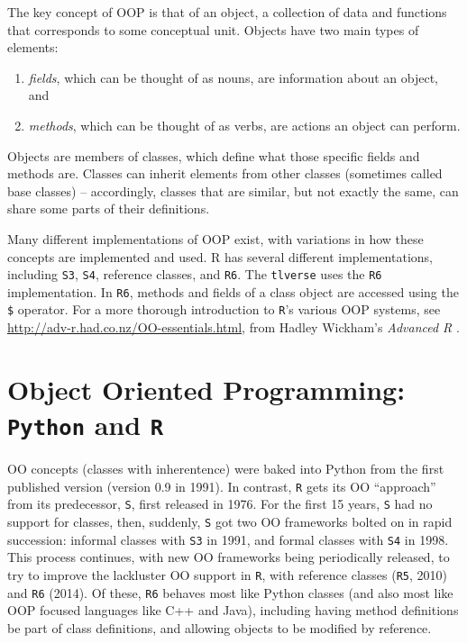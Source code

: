 \documentclass[
  12pt, krantz2,
]{krantz}
\newcommand{\passthrough}[1]{#1}
\providecommand{\tightlist}{%
  \setlength{\itemsep}{0pt}\setlength{\parskip}{0pt}}
\theoremstyle{definition}
\theoremstyle{definition}
\theoremstyle{definition}
\newcommand{\1}{\mathbbm{1}}
\begin{document}
The key concept of OOP is that of an object, a collection of data and functions
that corresponds to some conceptual unit. Objects have two main types of
elements:

\begin{enumerate}
\def\labelenumi{\arabic{enumi}.}
\tightlist
\item
  \emph{fields}, which can be thought of as nouns, are information about an object,
  and
\item
  \emph{methods}, which can be thought of as verbs, are actions an object can
  perform.
\end{enumerate}

Objects are members of classes, which define what those specific fields and
methods are. Classes can inherit elements from other classes (sometimes called
base classes) -- accordingly, classes that are similar, but not exactly the
same, can share some parts of their definitions.

Many different implementations of OOP exist, with variations in how these
concepts are implemented and used. R has several different implementations,
including \passthrough{\lstinline!S3!}, \passthrough{\lstinline!S4!}, reference classes, and \passthrough{\lstinline!R6!}. The \passthrough{\lstinline!tlverse!} uses the \passthrough{\lstinline!R6!}
implementation. In \passthrough{\lstinline!R6!}, methods and fields of a class object are accessed using
the \passthrough{\lstinline!$!} operator. For a more thorough introduction to \passthrough{\lstinline!R!}'s various OOP systems,
see \url{http://adv-r.had.co.nz/OO-essentials.html}, from Hadley Wickham's \emph{Advanced
R} \citep{wickham2014advanced}.

\hypertarget{object-oriented-programming-python-and-r}{%
\section{\texorpdfstring{Object Oriented Programming: \texttt{Python} and \texttt{R}}{Object Oriented Programming: Python and R}}\label{object-oriented-programming-python-and-r}}

OO concepts (classes with inherentence) were baked into Python from the first
published version (version 0.9 in 1991). In contrast, \passthrough{\lstinline!R!} gets its OO ``approach''
from its predecessor, \passthrough{\lstinline!S!}, first released in 1976. For the first 15 years, \passthrough{\lstinline!S!}
had no support for classes, then, suddenly, \passthrough{\lstinline!S!} got two OO frameworks bolted on
in rapid succession: informal classes with \passthrough{\lstinline!S3!} in 1991, and formal classes with
\passthrough{\lstinline!S4!} in 1998. This process continues, with new OO frameworks being periodically
released, to try to improve the lackluster OO support in \passthrough{\lstinline!R!}, with reference
classes (\passthrough{\lstinline!R5!}, 2010) and \passthrough{\lstinline!R6!} (2014). Of these, \passthrough{\lstinline!R6!} behaves most like Python
classes (and also most like OOP focused languages like C++ and Java), including
having method definitions be part of class definitions, and allowing objects to
be modified by reference.

  

\backmatter
\printindex
\end{document}
